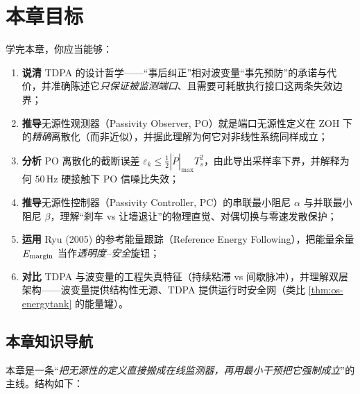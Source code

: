 \section*{本章目标}
学完本章，你应当能够：
\begin{enumerate}
  \item \textbf{说清} TDPA 的设计哲学——“事后纠正”相对波变量“事先预防”的承诺与代价，并准确陈述它\emph{只保证被监测端口}、且需要可耗散执行接口这两条失效边界；
  \item \textbf{推导}无源性观测器（Passivity Observer, PO）就是端口无源性定义在 ZOH 下的\emph{精确}离散化（而非近似），并据此理解为何它对非线性系统同样成立；
  \item \textbf{分析} PO 离散化的截断误差 $\varepsilon_k\le\tfrac12|\dot P|_{\max}T_s^2$，由此导出采样率下界，并解释为何 $50\,\mathrm{Hz}$ 硬接触下 PO 信噪比失效；
  \item \textbf{推导}无源性控制器（Passivity Controller, PC）的串联最小阻尼 $\alpha$ 与并联最小阻尼 $\beta$，理解“刹车 vs 让墙退让”的物理直觉、对偶切换与零速发散保护；
  \item \textbf{运用} Ryu (2005) 的参考能量跟踪（Reference Energy Following），把能量余量 $E_{\rm margin}$ 当作\emph{透明度–安全}旋钮；
  \item \textbf{对比} TDPA 与波变量的工程失真特征（持续粘滞 vs 间歇脉冲），并理解双层架构——波变量提供结构性无源、TDPA 提供运行时安全网（类比 \cref{thm:os-energytank} 的能量罐）。
\end{enumerate}

\subsection*{本章知识导航}
本章是一条“\emph{把无源性的定义直接搬成在线监测器，再用最小干预把它强制成立}”的主线。结构如下：

